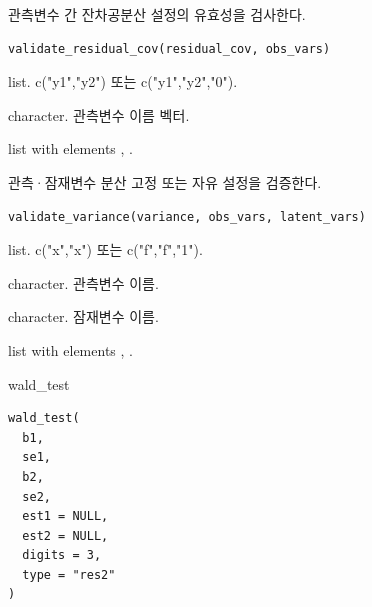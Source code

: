 \documentclass[a4paper]{book}
\begin{document}
%
\begin{Description}
관측변수 간 잔차공분산 설정의 유효성을 검사한다.
\end{Description}
%
\begin{Usage}
\begin{verbatim}
validate_residual_cov(residual_cov, obs_vars)
\end{verbatim}
\end{Usage}
%
\begin{Arguments}
\begin{ldescription}
\item[\code{residual\_cov}] list. c("y1","y2") 또는 c("y1","y2","0").

\item[\code{obs\_vars}] character. 관측변수 이름 벡터.
\end{ldescription}
\end{Arguments}
%
\begin{Value}
list with elements , .
\end{Value}
%
\begin{Description}
관측·잠재변수 분산 고정 또는 자유 설정을 검증한다.
\end{Description}
%
\begin{Usage}
\begin{verbatim}
validate_variance(variance, obs_vars, latent_vars)
\end{verbatim}
\end{Usage}
%
\begin{Arguments}
\begin{ldescription}
\item[\code{variance}] list. c("x","x") 또는 c("f","f","1").

\item[\code{obs\_vars}] character. 관측변수 이름.

\item[\code{latent\_vars}] character. 잠재변수 이름.
\end{ldescription}
\end{Arguments}
%
\begin{Value}
list with elements , .
\end{Value}
%
\begin{Description}
wald\_test
\end{Description}
%
\begin{Usage}
\begin{verbatim}
wald_test(
  b1,
  se1,
  b2,
  se2,
  est1 = NULL,
  est2 = NULL,
  digits = 3,
  type = "res2"
)
\end{verbatim}
\end{Usage}
\end{document}
